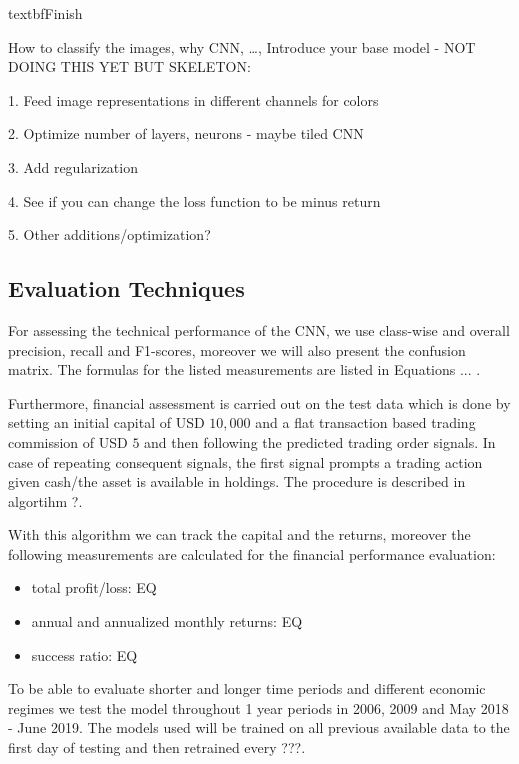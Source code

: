 \documentclass[11pt, a4paper]{article}
\begin{document}
textbf{Finish}


How to classify the images, why CNN, \dots, 
Introduce your base model - NOT DOING THIS YET BUT SKELETON:

1. Feed image representations in different channels for colors

2. Optimize number of layers, neurons - maybe tiled CNN

3. Add regularization

4. See if you can change the loss function to be minus return

5. Other additions/optimization?

\subsection{Evaluation Techniques}

For assessing the technical performance of the CNN, we use class-wise and overall precision, recall and F1-scores, moreover we will also present the confusion matrix. 
The formulas for the listed measurements are listed in Equations ... .

Furthermore, financial assessment is carried out on the test data which is done by setting an initial capital of USD $10,000$ and a flat transaction based trading commission of USD $5$ and then following the predicted trading order signals.
In case of repeating consequent signals, the first signal prompts a trading action given cash/the asset is available in holdings. The procedure is described in algortihm ?.

With this algorithm we can track the capital and the returns, moreover the following measurements are calculated for the financial performance evaluation:

\begin{itemize}
    \item total profit/loss: EQ
    \item annual and annualized monthly returns: EQ
    \item success ratio: EQ 
\end{itemize}

To be able to evaluate shorter and longer time periods and different economic regimes we test the model throughout 1 year periods in 2006, 2009 and May 2018 - June 2019. The models used will be trained on all previous available data to the first day of testing and then retrained every ???.
\end{document}
